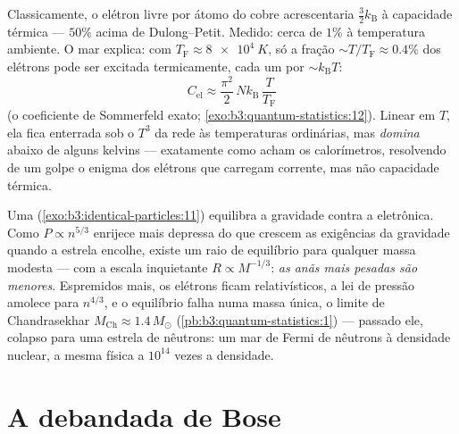 \begin{example}\label{ex:b3:quantum-statistics:heat}
Classicamente, o elétron livre por átomo do cobre acrescentaria $\tfrac32
k_{\text{B}}$ à capacidade térmica --- $50\%$ acima de
Dulong--Petit. Medido: cerca de $1\%$ à temperatura ambiente. O mar
explica: com $T_{\text{F}} \approx \qty{8e4}{K}$, só a
fração $\sim T/T_{\text{F}} \approx 0.4\%$ dos elétrons pode ser
excitada termicamente, cada um por $\sim k_{\text{B}}T$:
\[
C_{\text{el}} \approx \frac{\pi^2}{2}\,
Nk_{\text{B}}\,\frac{T}{T_{\text{F}}}
\]
(o coeficiente de Sommerfeld exato;
\cref{exo:b3:quantum-statistics:12}). Linear em $T$, ela fica enterrada
sob o $T^3$ da rede às temperaturas ordinárias, mas
\emph{domina} abaixo de alguns kelvins --- exatamente como acham os
calorímetros, resolvendo de um golpe o enigma dos elétrons que
carregam corrente, mas não capacidade térmica.
\end{example}

\begin{example}\label{ex:b3:quantum-statistics:dwarf}
Uma  (\cref{exo:b3:identical-particles:11}) equilibra a
gravidade contra a  eletrônica. Como $P \propto
n^{5/3}$ enrijece mais depressa do que crescem as exigências da
gravidade quando a estrela encolhe, existe um raio de equilíbrio para
qualquer massa modesta --- com a escala inquietante $R \propto M^{-1/3}$:
\emph{as anãs mais pesadas são menores}. Espremidos mais, os elétrons
ficam relativísticos, a lei de pressão amolece para $n^{4/3}$, e o
equilíbrio falha numa massa única, o limite de Chandrasekhar
$M_{\text{Ch}} \approx
1.4\,M_\odot$ (\cref{pb:b3:quantum-statistics:1}) --- passado ele,
colapso para uma estrela de nêutrons: um mar de Fermi de nêutrons à
densidade nuclear, a mesma física a $10^{14}$ vezes a densidade.
\end{example}

\section{A debandada de Bose}

